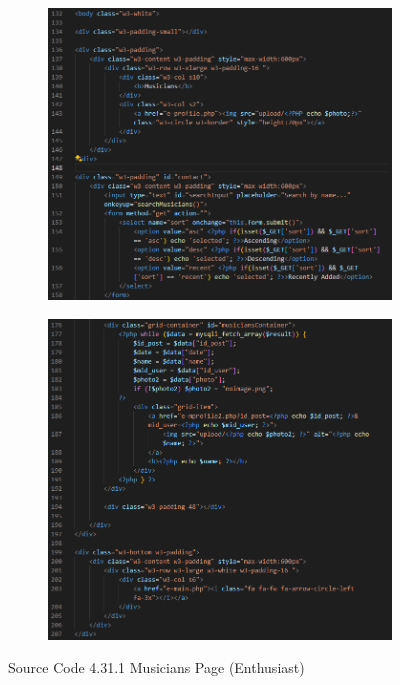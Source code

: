 \begin{enumerate}[1.]
\begin{figure}[h]
\begin{subfigure}[b]{0.7\textwidth}
            \includegraphics[width=\textwidth]{mainmatter/images/frontend/code/eallmusic.png}
            \label{fig:sub1}
        \end{subfigure}
        \hspace{0.04\textwidth}
        \begin{subfigure}[b]{0.7\textwidth}
            \centering
            \includegraphics[width=\textwidth]{mainmatter/images/frontend/code/eallmusic2.png}
            \label{fig:sub2}
        \end{subfigure}
        \caption*{Source Code 4.31.1 Musicians Page (Enthusiast)}
        \label{fig:myfig70a}
    \end{figure}
\end{enumerate}

